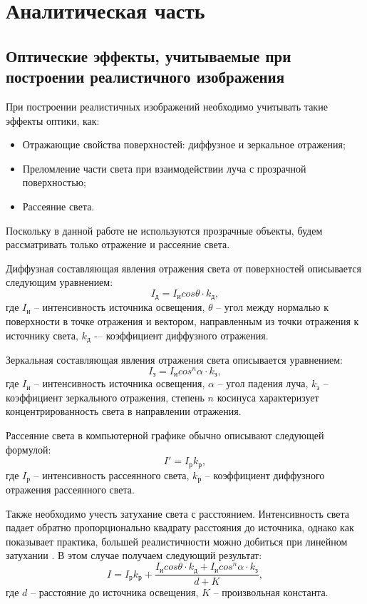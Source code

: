 \chapter{Аналитическая часть}
\section{Оптические эффекты, учитываемые при построении реалистичного изображения}
При построении реалистичных изображений необходимо учитывать такие эффекты оптики, как:
\begin{itemize}
	\item Отражающие свойства поверхностей: диффузное и зеркальное отражения;
	\item Преломление части света при взаимодействии луча с прозрачной поверхностью;
	\item Рассеяние света.
\end{itemize}

Поскольку в данной работе не используются прозрачные объекты, будем рассматривать только отражение и рассеяние света.

Диффузная составляющая явления отражения света от поверхностей описывается следующим уравнением:
\begin{equation}
	I_\text{д} = I_\text{и} cos\theta \cdot k_\text{д}, 
\end{equation}
где $I_\text{и}$ -- интенсивность источника освещения, $\theta$ – угол между нормалью к поверхности в точке отражения и вектором, направленным из точки отражения к источнику света, $k_\text{д}$ -– коэффициент диффузного отражения.

Зеркальная составляющая явления отражения света описывается уравнением:
\begin{equation}
	I_\text{з} = I_\text{и} cos^n\alpha \cdot k_\text{з}, 
\end{equation}
где $I_\text{и}$ -- интенсивность источника освещения, $\alpha$ -- угол падения луча, $k_\text{з}$ -- коэффициент зеркального отражения, степень $n$ косинуса характеризует концентрированность света в направлении отражения.

Рассеяние света в компьютерной графике обычно описывают следующей формулой:
\begin{equation}
	I' = I_\text{р}k_\text{р}, 
\end{equation}
где $I_\text{р}$ -- интенсивность рассеянного света, $k_\text{р}$ -- коэффициент диффузного отражения рассеянного света.

Также необходимо учесть затухание света с расстоянием. Интенсивность света падает обратно пропорционально квадрату расстояния до источника, однако как показывает практика, большей реалистичности можно добиться при линейном затухании \cite{lit1}. В этом случае получаем следующий результат:
\begin{equation}
	I = I_\text{р}k_\text{р} + \frac{I_\text{и} cos\theta \cdot k_\text{д} + I_\text{и} cos^n\alpha \cdot k_\text{з}}{d + K}, 
\end{equation}
где $d$ -- расстояние до источника освещения, $K$ -- произвольная константа.


